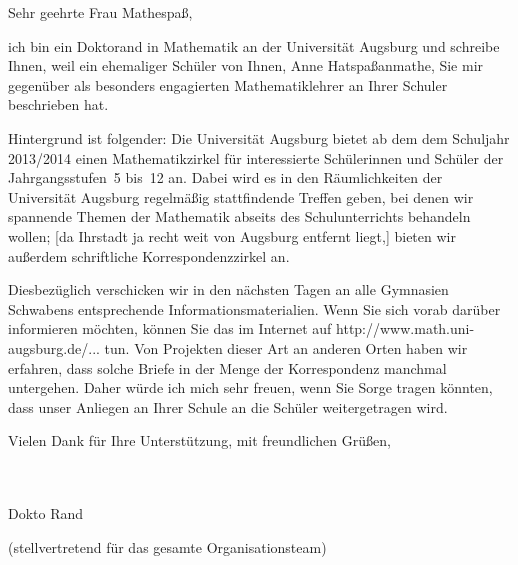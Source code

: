 \documentclass{zirkelbrief}
\begin{document}
\renewcommand{\anschrift}{%
      Holbein-Gymnasium Augsburg \\
      Fachbereich Mathematik \\
      Hallstraße 10 \\
      86150 Augsburg}
\renewcommand{\datum}{2.9.2013}
\renewcommand{\betreff}{Matheschülerzirkel der Universität Augsburg}
\renewcommand{\absender}{%
      \textbf{Dokto Rand} \\
      \ \\
      Lehrstuhl für spannende Mathematik \\
      Universitätsstr. 14 \\
      86159 Augsburg \\
      \ \\
      Telefon \> +49 (0) 821 598 -- ???? \\
      Telefax \> +49 (0) 821 598 -- ???? \\
      \textsf{dokto.rand@math.uni-augsburg.de} \\
      \textsf{http:/\!/www.math.uni-augsburg.de/alg} \\}

\makeletterhead

Sehr geehrte Frau Mathespaß,

ich bin ein Doktorand in Mathematik an der Universität Augsburg und schreibe
Ihnen, weil ein ehemaliger Schüler von Ihnen, Anne Hatspaßanmathe, Sie mir
gegenüber als besonders engagierten Mathematiklehrer an Ihrer Schuler
beschrieben hat.

Hintergrund ist folgender: Die Universität Augsburg bietet ab dem dem Schuljahr 2013/2014 einen
Mathematikzirkel für interessierte Schülerinnen und Schüler der
Jahrgangsstufen~5 bis~12 an. Dabei wird es in den Räumlichkeiten der
Universität Augsburg regelmäßig stattfindende Treffen geben, bei denen wir
spannende Themen der Mathematik abseits des Schulunterrichts behandeln wollen;
[da Ihrstadt ja recht weit von Augsburg entfernt liegt,] bieten wir außerdem
schriftliche Korrespondenzzirkel an.

Diesbezüglich verschicken wir in den nächsten Tagen an alle Gymnasien Schwabens
entsprechende Informationsmaterialien. Wenn Sie sich vorab darüber informieren
möchten, können Sie das im Internet auf
\textsf{http:/\!/www.math.uni-augsburg.de/...} tun. Von Projekten dieser Art an
anderen Orten haben wir erfahren, dass solche Briefe in der Menge der
Korrespondenz manchmal untergehen. Daher würde ich mich sehr freuen, wenn Sie
Sorge tragen könnten, dass unser Anliegen an Ihrer Schule an die Schüler
weitergetragen wird.

Vielen Dank für Ihre Unterstützung, mit freundlichen Grüßen,

\ \\
\ \\

\qquad Dokto Rand

\qquad (stellvertretend für das gesamte Organisationsteam)
\end{document}
